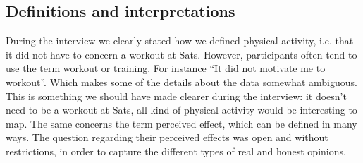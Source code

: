 \subsection{Definitions and interpretations }
During the interview we clearly stated how we defined physical activity, i.e. that it did not have to concern a workout at Sats. However, participants often tend to use the term workout or training. For instance “It did not motivate me to workout”. Which makes some of the details about the data somewhat ambiguous. This is something we should have made clearer during the interview: it doesn't need to be a workout at Sats, all kind of physical activity would be interesting to map. The same concerns the term perceived effect, which can be defined in many ways. The question regarding their perceived effects was open and without restrictions, in order to capture the different types of real and honest opinions.


